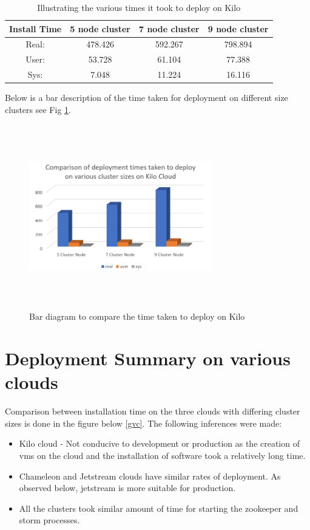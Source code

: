 \documentclass[9pt,twocolumn,twoside]{../../styles/osajnl}
\begin{document}
\begin{table}[!htb]
\centering
\caption{Illustrating the various times it took to deploy on Kilo}\label{T:timekilo}
\begin{center}
 \begin{tabular}{|c|| c c c|} 
 \hline
 Install Time & 5 node cluster & 7 node cluster & 9 node cluster\\ [0.5ex]
 \hline\hline
 Real: & 478.426 & 592.267 & 798.894 \\ 
 \hline
 User: & 53.728 & 61.104 & 77.388 \\
 \hline
 Sys: & 7.048 & 11.224 & 16.116 \\
 \hline
\end{tabular}
\end{center}
\end{table}

Below is a bar description of the time taken for deployment on different size 
clusters see Fig \ref{i:timekilo}.

\begin{figure}[!htb]
  \includegraphics[width=8cm,height=8cm,keepaspectratio,width=\linewidth]{images/bar-3.png}
  \caption{Bar diagram to compare the time taken to deploy on Kilo}
  \label{i:timekilo}
\end{figure}

\section{Deployment Summary on various clouds}
Comparison between installation time on the three clouds with differing
cluster sizes is done in the figure below \ref{gvc}. The following inferences 
were made:
\begin{itemize}
\item Kilo cloud - Not conducive to development or production as the creation of 
vms on the cloud and the installation of software took a relatively long time.
\item Chameleon and Jetstream clouds have similar rates of deployment. As 
observed below, jetstream is more suitable for production.
\item All the clusters took similar amount of time for starting the zookeeper 
and storm processes.
\end{itemize}
\end{document}
